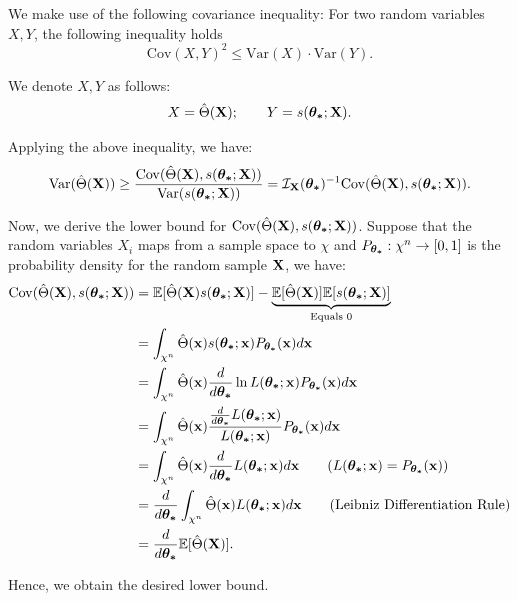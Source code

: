 \begin{proof*}
    We make use of the following covariance inequality: For two random variables $X, Y$, the following inequality holds
    \begin{equation}
        \mathrm{Cov}(X, Y)^2 \le \mathrm{Var}(X)\cdot\mathrm{Var}(Y).
    \end{equation} 

    \noindent We denote $X, Y$ as follows:
    \begin{align*}
        X = \hat\Theta({\bf X}); \qquad Y = s(\boldsymbol{\theta_*};{\bf X}). 
    \end{align*} 

    \noindent Applying the above inequality, we have:
    \begin{align*}
        \mathrm{Var}(\hat\Theta({\bf X})) \ge \frac{\mathrm{Cov}(\hat\Theta({\bf X}), s(\boldsymbol{\theta_*};{\bf X}))}{\mathrm{Var}(s(\boldsymbol{\theta_*};{\bf X}))} = \mathcal{I}_{{\bf X}}(\boldsymbol{\theta_*})^{-1}\mathrm{Cov}(\hat\Theta({\bf X}), s(\boldsymbol{\theta_*};{\bf X})).
    \end{align*} 

    \noindent Now, we derive the lower bound for $\mathrm{Cov}(\hat\Theta({\bf X}), s(\boldsymbol{\theta_*};{\bf X}))$. Suppose that the random variables $X_i$ maps from a sample space to $\chi$ and $P_{\boldsymbol{\theta_*}}:\chi^n\to [0,1]$ is the probability density for the random sample ${\bf X}$, we have:
    \begin{align*}
        \mathrm{Cov}(\hat\Theta({\bf X}), s(\boldsymbol{\theta_*};{\bf X})) &= \mathbb{E}[\hat\Theta({\bf X})s(\boldsymbol{\theta_*};{\bf X})] - \underbrace{\mathbb{E}[\hat\Theta({\bf X})]\mathbb{E}[s(\boldsymbol{\theta_*};{\bf X})]}_{\text{Equals } 0} \\
        &= \int_{\chi^n} \hat\Theta({\bf x}) s(\boldsymbol{\theta_*};{\bf x})P_{\boldsymbol{\theta_*}}({\bf x})d{\bf x} \\
        &= \int_{\chi^n} \hat\Theta({\bf x}) \frac{d}{d\boldsymbol{\theta_*}}\ln L(\boldsymbol{\theta_*};{\bf x}) P_{\boldsymbol{\theta_*}}({\bf x})d{\bf x} \\
        &= \int_{\chi^n} \hat\Theta({\bf x}) \frac{\frac{d}{d\boldsymbol{\theta_*}}L(\boldsymbol{\theta_*};{\bf x})}{L(\boldsymbol{\theta_*};{\bf x})}P_{\boldsymbol{\theta_*}}({\bf x})d{\bf x} \\
        &= \int_{\chi^n} \hat\Theta({\bf x})\frac{d}{d\boldsymbol{\theta_*}}L(\boldsymbol{\theta_*};{\bf x})d{\bf x} \qquad (L(\boldsymbol{\theta_*};{\bf x}) = P_{\boldsymbol{\theta_*}}({\bf x})) \\
        &= \frac{d}{d\boldsymbol{\theta_*}}\int_{\chi^n}\hat\Theta({\bf x})L(\boldsymbol{\theta_*};{\bf x})d{\bf x} \qquad (\text{Leibniz Differentiation Rule}) \\
        &= \frac{d}{d\boldsymbol{\theta_*}}\mathbb{E}[\hat\Theta({\bf X})].
    \end{align*} 

    \noindent Hence, we obtain the desired lower bound.
\end{proof*} 



